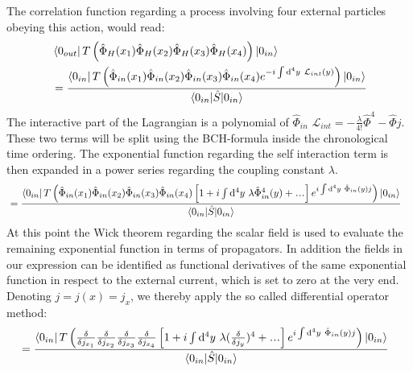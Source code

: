 \documentclass[12pt, titlepage]{article}
\newcommand\mydots{\makebox[1em][c]{.\hfil.\hfil.}}
\begin{document}
The correlation function regarding a process involving four external particles obeying this action, would read:
\begin{equation}
\begin{split}
&\bra{0_{out}}
T\left( 
\hat{\Phi}_{H}(x_1)
\hat{\Phi}_{H}(x_2)
\hat{\Phi}_{H}(x_3)
\hat{\Phi}_{H}(x_4)
\right) 
\ket{0_{in}}
\\
&=\dfrac{
\bra{0_{in}}
T\left( 
\hat{\Phi}_{in}(x_1)
\hat{\Phi}_{in}(x_2)
\hat{\Phi}_{in}(x_3)
\hat{\Phi}_{in}(x_4)
e^{-i\int \mathrm{d}^{4}y\ \mathcal{L}_{int}(y)}
\right)
\ket{0_{in}}
}{\braket{0_{in}|\hat{S}|0_{in}}}
\end{split}
\end{equation}
The interactive part of the Lagrangian is a polynomial of $\hat{\Phi}_{in} $ $ \mathcal{L}_{int} =  -\frac{\lambda}{4!}\hat{\Phi}^{4} -\hat{\Phi} j$. These two terms will be split using the BCH-formula inside the chronological time ordering. The exponential function regarding the self interaction term is then expanded in a power series regarding the coupling constant $ \lambda $. 
\begin{equation}
\begin{split}
&=\dfrac{
\bra{0_{in}}
T\left( 
\hat{\Phi}_{in}(x_1)
\hat{\Phi}_{in}(x_2)
\hat{\Phi}_{in}(x_3)
\hat{\Phi}_{in}(x_4)
\left[ 
1 + 
i\int\mathrm{d}^{4}y\ \lambda\hat{\Phi}_{in}^{4}(y)
+\mydots
\right] 
e^{i\int \mathrm{d}^{4}y\ \hat{\Phi}_{in}(y)j }
\right)
\ket{0_{in}}
}{\braket{0_{in}|\hat{S}|0_{in}}}
\end{split}
\end{equation}
At this point the Wick theorem regarding the scalar field is used to evaluate the remaining exponential function in  terms of propagators. In addition the fields in our expression can be identified as functional derivatives of the same exponential function in respect to the external current, which is set to zero at the very end. Denoting $ j = j(x) = j_{x} $, we thereby apply the so called differential operator method:
\begin{equation}
\begin{split}
&=\dfrac{
\bra{0_{in}}
T\left( 
\frac{\delta}{\delta j_{x_{1}}}
\frac{\delta}{\delta j_{x_{2}}}
\frac{\delta}{\delta j_{x_{3}}}
\frac{\delta}{\delta j_{x_{4}}}
\left[ 
1 + 
i\int\mathrm{d}^{4}y\ \lambda(\frac{\delta}{\delta j_{y}})^{4}
+\mydots
\right] 
e^{i\int \mathrm{d}^{4}y\ \hat{\Phi}_{in}(y)j }
\right)
\ket{0_{in}}
}{\braket{0_{in}|\hat{S}|0_{in}}}
\end{split}
\end{equation}
\end{document}
